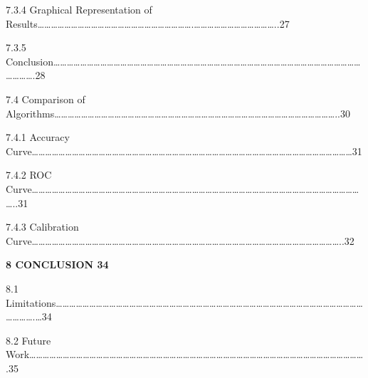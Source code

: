 \documentclass[a4paper,12pt]{article}
\begin{document}
7.3.4 Graphical Representation of
Results\ldots\ldots\ldots\ldots\ldots\ldots\ldots\ldots\ldots\ldots\ldots\ldots\ldots\ldots\ldots\ldots\ldots\ldots\ldots\ldots\ldots\ldots\ldots.\ldots\ldots\ldots\ldots\ldots\ldots\ldots\ldots\ldots\ldots\ldots\ldots..27

7.3.5
Conclusion\ldots\ldots\ldots\ldots\ldots\ldots\ldots\ldots\ldots\ldots\ldots\ldots\ldots\ldots\ldots\ldots\ldots\ldots\ldots\ldots\ldots\ldots\ldots\ldots\ldots\ldots\ldots\ldots\ldots\ldots\ldots\ldots\ldots\ldots\ldots\ldots\ldots\ldots\ldots\ldots\ldots\ldots\ldots\ldots\ldots\ldots\ldots\ldots\ldots\ldots.28

7.4 Comparison of
Algorithms\ldots\ldots\ldots\ldots\ldots\ldots\ldots\ldots\ldots\ldots\ldots\ldots\ldots\ldots\ldots\ldots\ldots\ldots\ldots\ldots\ldots\ldots\ldots\ldots\ldots\ldots\ldots\ldots\ldots\ldots\ldots\ldots\ldots\ldots\ldots\ldots\ldots\ldots\ldots\ldots\ldots\ldots..30

7.4.1 Accuracy
Curve\ldots\ldots\ldots\ldots\ldots\ldots\ldots\ldots\ldots\ldots\ldots\ldots\ldots\ldots\ldots\ldots\ldots\ldots\ldots\ldots\ldots\ldots\ldots\ldots\ldots\ldots\ldots\ldots\ldots\ldots\ldots\ldots\ldots\ldots\ldots\ldots\ldots\ldots\ldots\ldots\ldots\ldots\ldots\ldots\ldots\ldots\ldots\ldots31

7.4.2 ROC
Curve\ldots\ldots\ldots\ldots\ldots\ldots\ldots\ldots\ldots\ldots\ldots\ldots\ldots\ldots\ldots\ldots\ldots\ldots\ldots\ldots\ldots\ldots\ldots\ldots\ldots\ldots\ldots\ldots\ldots\ldots\ldots\ldots\ldots\ldots\ldots\ldots\ldots\ldots\ldots\ldots\ldots\ldots\ldots\ldots\ldots\ldots\ldots\ldots\ldots\ldots..31

7.4.3 Calibration
Curve\ldots\ldots\ldots\ldots\ldots\ldots\ldots\ldots\ldots\ldots\ldots\ldots\ldots\ldots\ldots\ldots\ldots\ldots\ldots\ldots\ldots\ldots\ldots\ldots\ldots\ldots\ldots\ldots\ldots\ldots\ldots\ldots\ldots\ldots\ldots\ldots\ldots\ldots\ldots\ldots\ldots\ldots\ldots\ldots\ldots\ldots..32

\textbf{8 CONCLUSION 34}

8.1
Limitations\ldots\ldots\ldots\ldots\ldots\ldots\ldots\ldots\ldots\ldots\ldots\ldots\ldots\ldots\ldots\ldots\ldots\ldots\ldots\ldots\ldots\ldots\ldots\ldots\ldots\ldots\ldots\ldots\ldots\ldots\ldots\ldots\ldots\ldots\ldots\ldots\ldots\ldots\ldots\ldots\ldots\ldots\ldots\ldots\ldots\ldots\ldots\ldots\ldots\ldots.\ldots34

8.2 Future
Work\ldots\ldots\ldots\ldots\ldots\ldots\ldots\ldots\ldots\ldots\ldots\ldots\ldots\ldots\ldots\ldots\ldots\ldots\ldots\ldots\ldots\ldots\ldots\ldots\ldots\ldots\ldots\ldots\ldots\ldots\ldots\ldots\ldots\ldots\ldots\ldots\ldots\ldots\ldots\ldots\ldots\ldots\ldots\ldots\ldots\ldots\ldots\ldots\ldots\ldots.35
\end{document}
